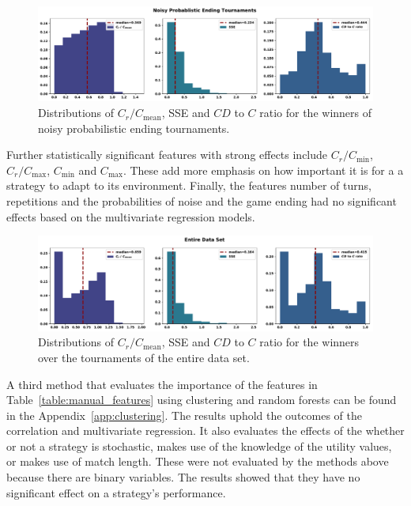\documentclass{article}
\begin{document}
\begin{figure}[!htbp]
    \centering
        \centering
        \includegraphics[width=\textwidth]{../images/probend_noisy_discussion.pdf}
        \caption{Distributions of \(C_r / C_{\text{mean}}\), SSE and \(CD\) to \(C\) ratio
        for the winners of noisy probabilistic ending tournaments.}
        \label{fig:discussion_probend_noisy}
\end{figure}

Further statistically significant features with strong effects include \(C_r /
C_{\text{min}}\), \(C_r / C_{\text{max}}\), \(C_{\text{min}}\) and
\(C_{\text{max}}\). These add more emphasis on how important it is for a  a
strategy to adapt to its environment. Finally, the features number of turns,
repetitions and the probabilities of noise and the game ending had no
significant effects based on the multivariate regression models.

\begin{figure}[!htbp]
    \centering
        \centering
        \includegraphics[width=\textwidth]{../images/entire_data_discussion.pdf}
        \caption{Distributions of \(C_r / C_{\text{mean}}\), SSE and \(CD\) to \(C\) ratio
        for the winners over the tournaments of the entire data set.}
        \label{fig:discussion_entire_data}
\end{figure}

A third method that evaluates the importance of the features in
Table~\ref{table:manual_features} using clustering and random forests can be found in
the Appendix~\ref{app:clustering}. The results uphold the outcomes of the
correlation and multivariate regression. It also evaluates the effects
of the whether or not a strategy is stochastic, makes use of the knowledge of the utility values, or makes use of match length. These were not evaluated by the methods above because there are binary variables.
The results showed that they have no significant effect on a strategy's
performance.
\end{document}
